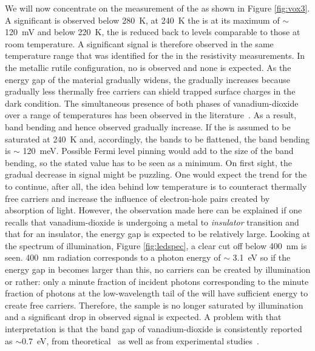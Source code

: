 We will now concentrate on the measurement of the \spv{} as shown in Figure \ref{fig:vox3}. A significant \spv{} is observed below \SI{280}{\kelvin}, at \SI{240}{\kelvin} the \spv{} is at its maximum of $\sim$ \SI{120}{\milli\volt} and below \SI{220}{\kelvin}, the \spv{} is reduced back to levels comparable to those at room temperature. A significant \spv{} signal is therefore observed in the same temperature range that was identified for the \mit{} in the resistivity measurements. In the metallic rutile configuration, no \spv{} is observed and none is expected. As the energy gap of the material gradually widens, the \spv{} gradually increases because gradually less thermally free carriers can shield trapped surface charges in the dark condition. The simultaneous presence of both phases of vanadium-dioxide over a range of temperatures has been observed in the literature~\cite{pergament_mixphase}. As a result, band bending and hence observed \spv{} gradually increase. If the \spv{} is assumed to be saturated at \SI{240}{\kelvin} and, accordingly, the bands to be flattened, the band bending is $\sim$ \SI{120}{\milli\electronvolt}. Possible Fermi level pinning would add to the size of the band bending, so the stated value has to be seen as a minimum. On first sight, the gradual decrease in \spv{} signal might be puzzling. One would expect the trend for the \spv{} to continue, after all, the idea behind low temperature \spv{} is to counteract thermally free carriers and increase the influence of electron-hole pairs created by absorption of light. However, the observation made here can be explained if one recalls that vanadium-dioxide is undergoing a metal to \emph{insulator} transition and that for an insulator, the energy gap is expected to be relatively large. Looking at the spectrum of illumination, Figure \ref{fig:ledspec}, a clear cut off below \SI{400}{\nano\metre} is seen. \SI{400}{\nano\metre} radiation corresponds to a photon energy of $\sim$ \SI{3.1}{\electronvolt} so if the energy gap in \vadiox{} becomes larger than this, no carriers can be created by illumination or rather: only a minute fraction of incident photons corresponding to the minute fraction of photons at the low-wavelength tail of the \led{} will have sufficient energy to create free carriers. Therefore, the sample is no longer saturated by illumination and a significant drop in observed \spv{} signal is expected. A problem with that interpretation is that the band gap of vanadium-dioxide is consistently reported as $\sim$\SI{0.7}{\electronvolt}, from theoretical~\cite{biermann_theogap} as well as from experimental studies~\cite{garcia_expgap,jensen_expgap,koethe_expstud,merenda_expgap}.\\
